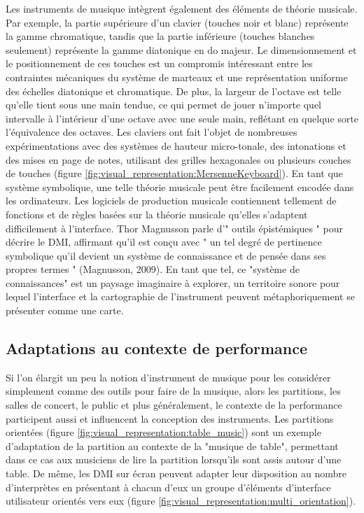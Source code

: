 Les instruments de musique intègrent également des éléments de théorie musicale. Par exemple, la partie supérieure d'un clavier (touches noir et blanc) représente la gamme chromatique, tandis que la partie inférieure (touches blanches seulement) représente la gamme diatonique en do majeur. Le dimensionnement et le positionnement de ces touches est un compromis intéressant entre les contraintes mécaniques du système de marteaux et une représentation uniforme des échelles diatonique et chromatique. De plus, la largeur de l'octave est telle qu'elle tient sous une main tendue, ce qui permet de jouer n'importe quel intervalle à l'intérieur d'une octave avec une seule main, reflétant en quelque sorte l'équivalence des octaves. Les claviers ont fait l'objet de nombreuses expérimentations avec des systèmes de hauteur micro-tonale, des intonations et des mises en page de notes, utilisant des grilles hexagonales ou plusieurs couches de touches (figure \ref{fig:visual_representation:MersenneKeyboard}). En tant que système symbolique, une telle théorie musicale peut être facilement encodée dans les ordinateurs. Les logiciels de production musicale contiennent tellement de fonctions et de règles basées sur la théorie musicale qu'elles s'adaptent difficilement à l'interface. Thor Magnusson parle d'" outils épistémiques " pour décrire le DMI, affirmant qu'il est conçu avec " un tel degré de pertinence symbolique qu'il devient un système de connaissance et de pensée dans ses propres termes " (Magnusson, 2009). En tant que tel, ce "système de connaissances" est un paysage imaginaire à explorer, un territoire sonore pour lequel l'interface et la cartographie de l'instrument peuvent métaphoriquement se présenter comme une carte.

\subsection{Adaptations au contexte de performance}
Si l'on élargit un peu la notion d'instrument de musique pour les considérer simplement comme des outils pour faire de la musique, alors les partitions, les salles de concert, le public et plus généralement, le contexte de la performance participent aussi et influencent la conception des instruments. Les partitions orientées (figure \ref{fig:visual_representation:table_music}) sont un exemple d'adaptation de la partition au contexte de la "musique de table", permettant dans ce cas aux musiciens de lire la partition lorsqu'ils sont assis autour d'une table. De même, les DMI sur écran peuvent adapter leur disposition au nombre d'interprètes en présentant à chacun d'eux un groupe d'éléments d'interface utilisateur orientés vers eux (figure \ref{fig:visual_representation:multi_orientation}).


